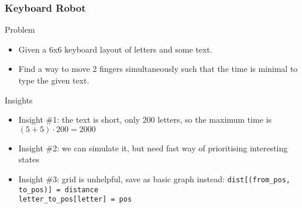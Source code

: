 \documentclass{beamer}
\begin{document}
\begin{frame}
    \frametitle{Keyboard Robot}
    \begin{block}{Problem}
        \begin{itemize}
            \item Given a 6x6 keyboard layout of letters and some text.
            \item Find a way to move 2 fingers simultaneously such that the time is minimal to type the given text.
        \end{itemize}
    \end{block}
    \begin{block}{Insights}
        \begin{itemize}
            \item Insight \#1: the text is short, only 200 letters, so the maximum time is $(5+5)\cdot200 = 2000$
            \item Insight \#2: we can simulate it, but need fast way of prioritising interesting states
            \item Insight \#3: grid is unhelpful, save as basic graph instead: 
                {\tt dist[(from\_pos, to\_pos)] = distance}\\ 
                {\tt letter\_to\_pos[letter] = pos}\\
        \end{itemize}
    \end{block}
\end{frame}
\end{document}
